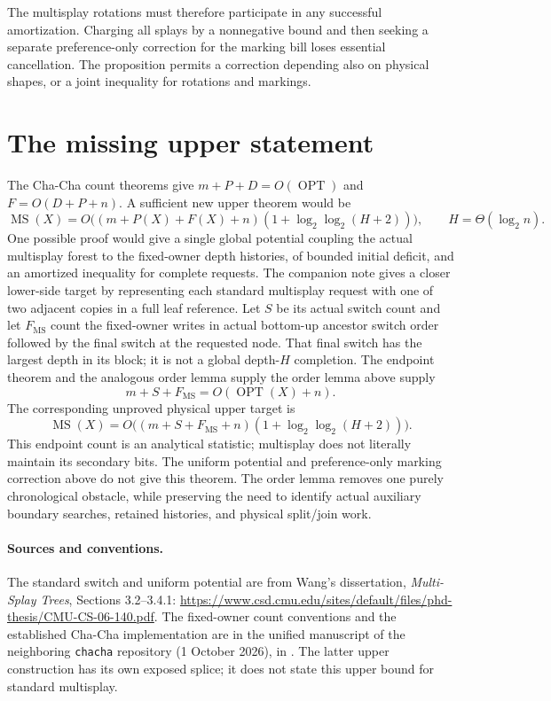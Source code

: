 \documentclass[11pt]{article}
\newcommand{\lgx}{\log_2}
\newcommand{\MS}{\operatorname{MS}}
\newcommand{\OPT}{\operatorname{OPT}}
\begin{document}
The multisplay rotations must therefore participate in any successful
amortization. Charging all splays by a nonnegative bound and then seeking
a separate preference-only correction for the marking bill loses essential
cancellation. The proposition permits a correction depending also on
physical shapes, or a joint inequality for rotations and markings.

\section{The missing upper statement}

The Cha-Cha count theorems give
$m+P+D=O(\OPT)$ and $F=O(D+P+n)$. A sufficient new upper theorem would be
\[
 \MS(X)=O\bigl((m+P(X)+F(X)+n)
                    (1+\lgx\lgx(H+2))\bigr),
 \qquad H=\Theta(\lgx n).
\]
One possible proof would give a single global potential coupling the
actual multisplay forest to the fixed-owner depth histories, of bounded
initial deficit, and an amortized inequality for complete requests.
The companion note  gives a closer lower-side
target by representing each standard multisplay request with one of two
adjacent copies in a full leaf reference. Let $S$ be its actual switch count
and let $F_{\MS}$ count the fixed-owner writes in actual bottom-up ancestor
switch order followed by the final switch at the requested node. That final
switch has the largest depth in its block; it is not a global depth-$H$
completion. The endpoint theorem and the analogous order lemma supply
the order lemma above supply
\[
 m+S+F_{\MS}=O(\OPT(X)+n).
\]
The corresponding unproved physical upper target is
\[
 \MS(X)=O\bigl((m+S+F_{\MS}+n)
                    (1+\lgx\lgx(H+2))\bigr).
\]
This endpoint count is an analytical statistic; multisplay does not
literally maintain its secondary bits.
The uniform potential and preference-only marking correction above do not
give this theorem. The order lemma removes one purely chronological
obstacle, while preserving the need to identify actual auxiliary boundary
searches, retained histories, and physical split/join work.

\paragraph{Sources and conventions.}
The standard switch and uniform potential are from Wang's dissertation,
\emph{Multi-Splay Trees}, Sections 3.2--3.4.1:
\url{https://www.csd.cmu.edu/sites/default/files/phd-thesis/CMU-CS-06-140.pdf}.
The fixed-owner count conventions and the established Cha-Cha
implementation are in the unified manuscript of the neighboring
\texttt{chacha} repository (1 October 2026), in
.
The latter upper construction has its own exposed splice; it does not
state this upper bound for standard multisplay.
\end{document}
